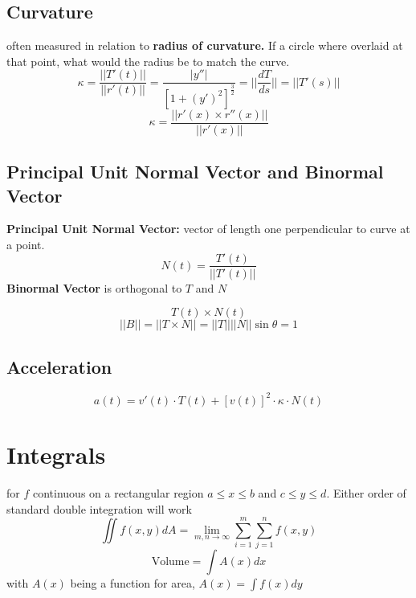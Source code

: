 \subsection{Curvature}
often measured in relation to \textbf{radius of curvature.} If a circle where overlaid at that point, what would the radius be to match the curve.
\begin{equation}
	\label{}
	\kappa=\frac{||T'(t)||}{||r'(t)||}=\frac{|y''|}{[1+(y')^{2}]^{\frac{3}{2}}}=||\frac{dT}{ds}||=||T'(s)||
\end{equation}
\begin{equation}
	\label{}
	\kappa=\frac{||r'(x)\times r''(x)||}{||r'(x)||}
\end{equation}

\subsection{Principal Unit Normal Vector and Binormal Vector}
\textbf{Principal Unit Normal Vector:} vector of length one perpendicular to curve at a point.
\begin{equation}
	\label{}
N(t)=\frac{T'(t)}{||T'(t)||}	
\end{equation}
\textbf{Binormal Vector} is orthogonal to $T$ and $N$


\begin{equation}
	\label{}
T(t)\times N(t)	
\end{equation}
\begin{equation}
	\label{}
||B||=||T \times N||=||T||||N||\sin\theta=1	
\end{equation}


\subsection{Acceleration}
\begin{equation}
	\label{}
	a(t)=v'(t)\cdot T(t) + [v(t)]^{2}\cdot\kappa\cdot N(t)	
\end{equation}

\section{Integrals}
for $f$ continuous on a rectangular region $a\leq x\leq b$ and $c\leq y\leq d$. Either order of standard double integration will work
\begin{equation}
	\label{}
\iint f(x,y)dA=\lim_{m,n\to\infty}\sum^{m}_{i=1}\sum^{n}_{j=1}f(x,y)
\end{equation}
\begin{equation}
	\label{}
	\mbox{Volume}=\int A(x)dx	
\end{equation}
with $A(x)$ being a function for area, $A(x)=\int f(x)dy$



